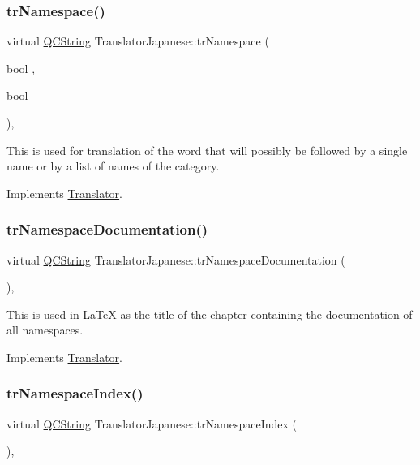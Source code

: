 \subsubsection{\texorpdfstring{trNamespace()}{trNamespace()}}
{\footnotesize\ttfamily virtual \mbox{\hyperlink{class_q_c_string}{Q\+C\+String}} Translator\+Japanese\+::tr\+Namespace (\begin{DoxyParamCaption}\item[{bool}]{,  }\item[{bool}]{ }\end{DoxyParamCaption})\hspace{0.3cm}{\ttfamily [inline]}, {\ttfamily [virtual]}}

This is used for translation of the word that will possibly be followed by a single name or by a list of names of the category. 

Implements \mbox{\hyperlink{class_translator}{Translator}}.

\mbox{\label{class_translator_japanese_a250823f8ed193feca9eb5d15ffe11919}} 
\subsubsection{\texorpdfstring{trNamespaceDocumentation()}{trNamespaceDocumentation()}}
{\footnotesize\ttfamily virtual \mbox{\hyperlink{class_q_c_string}{Q\+C\+String}} Translator\+Japanese\+::tr\+Namespace\+Documentation (\begin{DoxyParamCaption}{ }\end{DoxyParamCaption})\hspace{0.3cm}{\ttfamily [inline]}, {\ttfamily [virtual]}}

This is used in La\+TeX as the title of the chapter containing the documentation of all namespaces. 

Implements \mbox{\hyperlink{class_translator}{Translator}}.

\mbox{\label{class_translator_japanese_a236517c4d6c7bdf26cc79fd555a959df}} 
\subsubsection{\texorpdfstring{trNamespaceIndex()}{trNamespaceIndex()}}
{\footnotesize\ttfamily virtual \mbox{\hyperlink{class_q_c_string}{Q\+C\+String}} Translator\+Japanese\+::tr\+Namespace\+Index (\begin{DoxyParamCaption}{ }\end{DoxyParamCaption})\hspace{0.3cm}{\ttfamily [inline]}, {\ttfamily [virtual]}}

